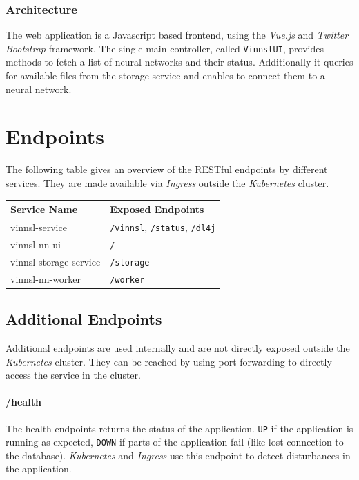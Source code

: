 \subsubsection{Architecture}\label{architecture}

The web application is a Javascript based frontend, using the
\emph{Vue.js} and \emph{Twitter Bootstrap} framework. The single main
controller, called \texttt{VinnslUI}, provides methods to fetch a list
of neural networks and their status. Additionally it queries for
available files from the storage service and enables to connect them to
a neural network.

\section{Endpoints}\label{endpoints}

The following table gives an overview of the RESTful endpoints by
different services. They are made available via \emph{Ingress} outside
the \emph{Kubernetes} cluster.

\begin{longtable}[]{@{}ll@{}}
\toprule
Service Name & Exposed Endpoints\tabularnewline
\midrule
\endhead
vinnsl-service & \texttt{/vinnsl}, \texttt{/status},
\texttt{/dl4j}\tabularnewline
vinnsl-nn-ui & \texttt{/}\tabularnewline
vinnsl-storage-service & \texttt{/storage}\tabularnewline
vinnsl-nn-worker & \texttt{/worker}\tabularnewline
\bottomrule
\end{longtable}

\subsection{Additional Endpoints}\label{additional-endpoints}

Additional endpoints are used internally and are not directly exposed
outside the \emph{Kubernetes} cluster. They can be reached by using port
forwarding to directly access the service in the cluster.

\paragraph{/health}\label{health}

The health endpoints returns the status of the application. \texttt{UP}
if the application is running as expected, \texttt{DOWN} if parts of the
application fail (like lost connection to the database).
\emph{Kubernetes} and \emph{Ingress} use this endpoint to detect
disturbances in the application.

